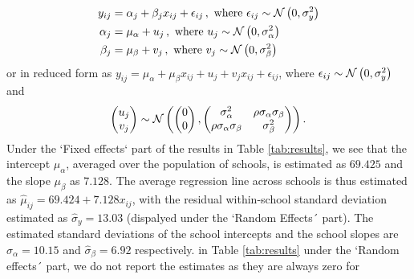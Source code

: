 \begin{align}
	y_{ij} &= \alpha_j + \beta_j x_{ij} +\epsilon_{ij} \,, \text{ where } \epsilon_{ij} \sim \mathcal{N}\left(0, \sigma_y^2\right) \\
	\alpha_j &= \mu_\alpha + u_j \,, \text{ where } u_j \sim \mathcal{N}\left(0, \sigma_\alpha^2\right)  \\
	\beta_j &= \mu_\beta + v_j \,, \text{ where } v_j \sim \mathcal{N}\left(0, \sigma_\beta^2\right)
\end{align}
or in reduced form as $y_{ij} = \mu_\alpha + \mu_\beta x_{ij} + u_j + v_j x_{ij} + \epsilon_{ij}$, where $\epsilon_{ij} \sim \mathcal{N}\left(0,\sigma_{y}^{2}\right)$ and
\begin{align}
	\left( \begin{matrix} u_j \\ v_j \end{matrix} \right) \sim \mathcal{N}\left( \left( \begin{matrix} 0 \\ 0 \end{matrix} \right) ,\left( \begin{matrix} { \sigma  }_{ \alpha  }^{ 2 } & \rho { \sigma  }_{ \alpha  }{ \sigma  }_{ \beta  } \\ \rho { \sigma  }_{ \alpha  }{ \sigma  }_{ \beta  } & { \sigma  }_{ \beta  }^{ 2 } \end{matrix} \right)\right).
\end{align}
Under the `Fixed effects` part of the results in Table \ref{tab:results}, we see that the intercept $\mu_{\alpha}$, averaged over the population of schools, is estimated as $69.425$ and the slope $\mu_{\beta}$ as $7.128$. The average regression line across schools is thus estimated as $\hat{\mu}_{ij} = 69.424 + 7.128 x_{ij}$, with the residual within-school standard deviation estimated as $\hat{\sigma}_{y}=13.03$ (dispalyed under the `Random Effects´ part). The estimated standard deviations of the school intercepts and the school slopes are $\hat{\sigma}_{\alpha}= 10.15$ and $\hat{\sigma}_{\beta}=6.92$ respectively. in Table \ref{tab:results} under the `Random effects´ part, we do not report the estimates as they are always zero for 

